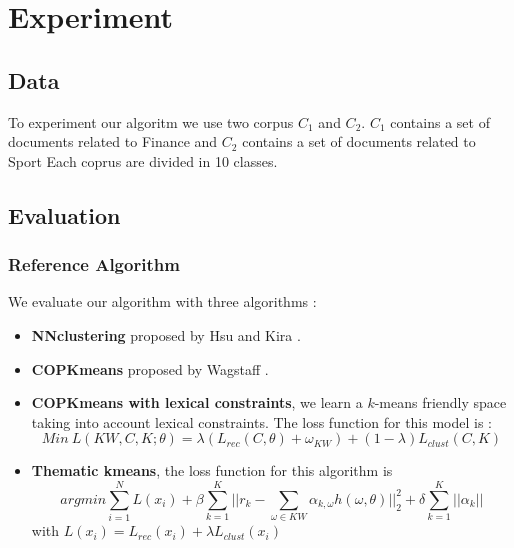 \section{Experiment}

\subsection{Data}
To experiment our algoritm we use two corpus $C_1$ and $C_2$. $C_1$ contains a
set of documents related to Finance and $C_2$ contains a set of documents
related to Sport Each coprus are divided in 10 classes.

\subsection{Evaluation}
\subsubsection{Reference Algorithm}
We evaluate our algorithm with three algorithms :
\begin{itemize}
\item \textbf{NNclustering} proposed by Hsu and Kira
\cite{2015arXiv151106321H}.
\item \textbf{COPKmeans} proposed by Wagstaff \cite{Wagstaff:2001:CKC:645530.655669}.
\item \textbf{COPKmeans with lexical constraints}, we learn a $k$-means
  friendly space taking into account lexical constraints. The loss
  function for this model is :
  $$
  Min~L(KW, C, K; \theta) = \lambda(L_{rec}(C, \theta) + \omega_{KW} )+
  (1-\lambda)L_{clust}(C,K)
  $$
\item \textbf{Thematic kmeans}, the loss function for this algorithm is
  \begin{equation*}
    argmin \sum_{i=1}^{N}L(x_i) + \beta\sum_{k=1}^{K}||r_k - \sum_{\omega \in KW}
    \alpha_{k,\omega}h(\omega, \theta)||_2^2 + \delta\sum_{k=1}^{K}||\alpha_k|| 
  \end{equation*}
  with $L(x_i) = L_{rec}(x_i) + \lambda L_{clust}(x_i)$
\end{itemize}
